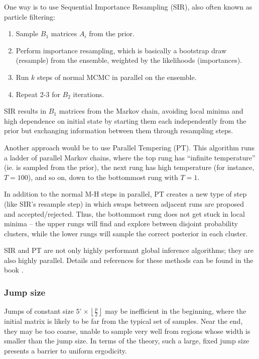 \documentclass{amsart}
\begin{document}
One way is to use Sequential Importance Resampling (SIR), also often known as particle filtering:
\begin{enumerate}
	\item Sample $B_1$ matrices $A_i$ from the prior.
	\item Perform importance resampling, which is basically a bootstrap draw (resample) from the ensemble, weighted by the likelihoods (importances).
	\item Run $k$ steps of normal MCMC in parallel on the ensemble.
	\item Repeat 2-3 for $B_2$ iterations.
\end{enumerate}
SIR results in $B_1$ matrices from the Markov chain, avoiding local minima and high dependence on initial state by starting them each independently from the prior but exchanging information between them through resampling steps.

Another approach would be to use Parallel Tempering (PT). This algorithm runs a ladder of parallel Markov chains, where the top rung has ``infinite temperature'' (ie. is sampled from the prior), the next rung has high temperature (for instance, $T=100$), and so on, down to the bottommost rung with $T=1$.

In addition to the normal M-H steps in parallel, PT creates a new type of step (like SIR's resample step) in which swaps between adjacent runs are proposed and accepted/rejected. Thus, the bottommost rung does not get stuck in local minima -- the upper rungs will find and explore between disjoint probability clusters, while the lower rungs will sample the correct posterior in each cluster.

SIR and PT are not only highly performant global inference algorithms; they are also highly parallel. Details and references for these methods can be found in the book \cite{LLC10}.

\subsubsection{Jump size}

Jumps of constant size $5^\circ\times\left\lfloor\frac{p}{2}\right\rfloor$ may be inefficient in the beginning, where the initial matrix is likely to be far from the typical set of samples. Near the end, they may be too coarse, unable to sample very well from regions whose width is smaller than the jump size. In terms of the theory, such a large, fixed jump size presents a barrier to uniform ergodicity.
\end{document}
